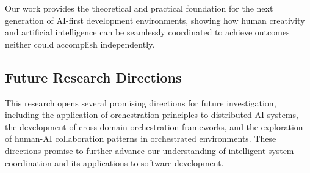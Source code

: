 Our work provides the theoretical and practical foundation for the next generation of AI-first development environments, showing how human creativity and artificial intelligence can be seamlessly coordinated to achieve outcomes neither could accomplish independently.

\subsection*{Future Research Directions}

This research opens several promising directions for future investigation, including the application of orchestration principles to distributed AI systems, the development of cross-domain orchestration frameworks, and the exploration of human-AI collaboration patterns in orchestrated environments. These directions promise to further advance our understanding of intelligent system coordination and its applications to software development.

